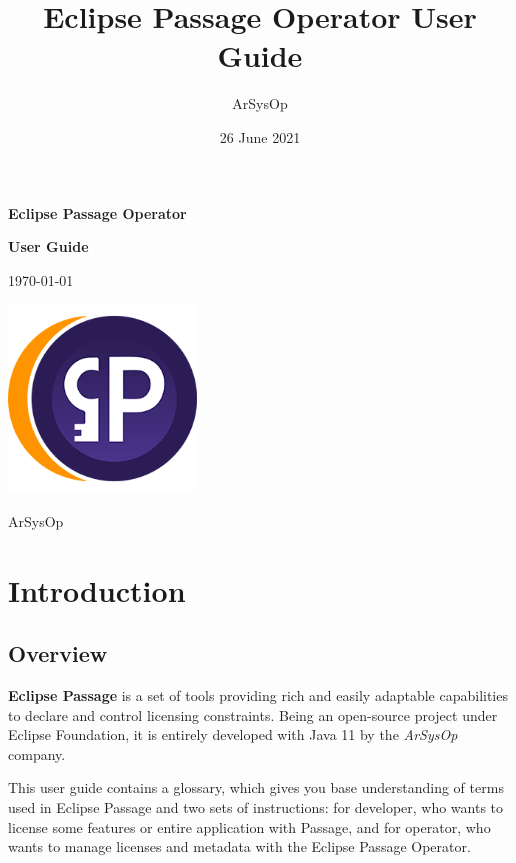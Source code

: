 \documentclass[12pt]{report}
\title{Eclipse Passage Operator User Guide}
\author{ArSysOp}
\date{26 June 2021}
\begin{document}
\begin{titlepage}
    \begin{center}

        \Huge
        \textbf{Eclipse Passage Operator}
        
        \vspace*{1cm}
        \Large
        \textbf{User Guide}

        \vspace{0.5cm}

        \Large
        \today

        \vfill

        \includegraphics[width=5cm]{passage}

        \vfill

        \Large
        ArSysOp
    \end{center}
\end{titlepage}

\tableofcontents
{}

\chapter*{Introduction}

\section*{Overview}

\textbf{Eclipse Passage} is a set of tools providing rich and easily adaptable capabilities to declare and control licensing constraints.
Being an open-source project under Eclipse Foundation, it is entirely developed with Java 11 by the \textit{ArSysOp} company.

This user guide contains a glossary, which gives you base understanding of terms used in Eclipse Passage and two sets of instructions: for developer, who
wants to license some features or entire application with Passage, and for operator, who wants to manage licenses and metadata with the Eclipse Passage Operator.
\end{document}
